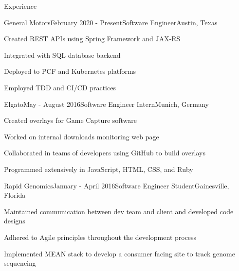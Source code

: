 \documentclass[
	11pt, %
]{resume} %
\begin{document}
\begin{rSection}{Experience}

	\begin{rSubsection}{General Motors}{February 2020 - Present}{Software Engineer}{Austin, Texas}
		\item Created REST APIs using Spring Framework and JAX-RS
		\item Integrated with SQL database backend
		\item Deployed to PCF and Kubernetes platforms
		\item Employed TDD and CI/CD practices
	\end{rSubsection}


	\begin{rSubsection}{Elgato}{May - August 2016}{Software Engineer Intern}{Munich, Germany}
		\item Created overlays for Game Capture software
		\item Worked on internal downloads monitoring web page
		\item Collaborated in teams of developers using GitHub to build overlays
		\item Programmed extensively in JavaScript, HTML, CSS, and Ruby
	\end{rSubsection}


	\begin{rSubsection}{Rapid Genomics}{January - April 2016}{Software Engineer Student}{Gainesville, Florida}
		\item Maintained communication between dev team and client and developed code designs
		\item Adhered to Agile principles throughout the development process
		\item Implemented MEAN stack to develop a consumer facing site to track genome sequencing
	\end{rSubsection}

\end{rSection}
\end{document}

